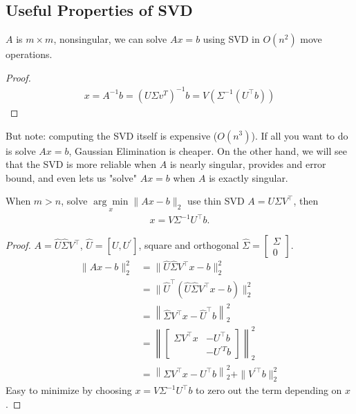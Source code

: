 \documentclass[11pt]{article}
\numberwithin{equation}{section}
\begin{document}
\subsection{Useful Properties of SVD}
\begin{fact}
    $A$ is $m \times m$, nonsingular, we can solve $Ax=b$ using SVD in $O(n^2)$ move operations.
    \begin{proof}
        \begin{align*}
            x=A^{-1} b=\left(U \Sigma v^{T}\right)^{-1} b=V\left(\Sigma^{-1}\left(U^{\top} b\right)\right)
        \end{align*}
    \end{proof}
    But note: computing the SVD itself is expensive ($O(n^3)$). If all you want to do is solve $Ax=b$, Gaussian Elimination is cheaper. 
    On the other hand, we will see that the SVD is more reliable when $A$ is nearly singular, provides and error bound, 
    and even lets us "solve" $Ax=b$ when $A$ is exactly singular.
\end{fact}

\begin{fact}
    When $m>n$, solve $\underset{x}{\arg\min} \|Ax-b\|_2$ use thin SVD $A=U \Sigma V^{\top}$, then \begin{align*}
        x=V\Sigma^{-1}U^\top b.
    \end{align*}
    \begin{proof}
        $A=\hat{U} \hat{\Sigma} V^{\top}$,
        $\hat{U}=\left[U, U^{\prime}\right]$, square and orthogonal
        $\hat{\Sigma}=\left[\begin{array}{l}
            \Sigma \\
            0
            \end{array}\right]$.
        \begin{align*}
            \|A x-b\|_{2}^{2} &= \| \hat{U} \hat{\Sigma} V^{\top} x-b \|_{2}^{2} \\
            &= \| \hat{U}^{\top}(\hat{U} \hat{\Sigma} V^{\top} x-b) \|_{2}^{2} \\
            &= \left\|\hat{\Sigma} V^{\top} x-\hat{U}^{\top} b\right\|_{2}^{2} \\
            &= \left\| \left[\begin{array}{ccc}
                \Sigma V^{\top} x & -U^{\top} b \\
                & -U^{\prime T} b
                \end{array}\right] \right\|_2^2 \\
            &= \left\|\Sigma V^{\top} x-U^{\top} b\right\|_{2}^{2} + \| V^{\prime \top} b \|_{2}^{2}
        \end{align*}
        Easy to minimize by choosing $x=V \Sigma^{-1} U^{\top } b$ to zero out the term depending on $x$.
    \end{proof}
\end{fact}
\end{document}
